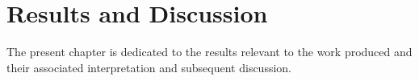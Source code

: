 


\chapter{Results and Discussion}
\label{chapter:results}

The present chapter is dedicated to the results relevant to the work produced and their associated interpretation and subsequent discussion.


%
%

